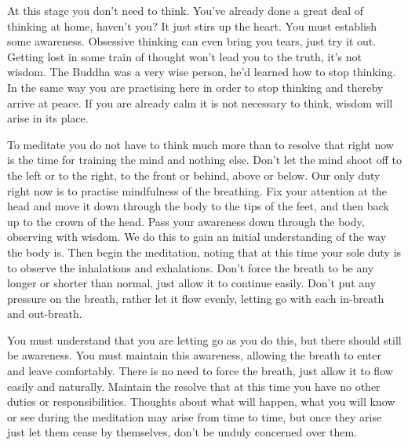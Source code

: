 At this stage you don't need to think. You've already done a great deal of thinking at home, haven't you? It just stirs up the heart. You must establish some awareness. Obsessive thinking can even bring you tears, just try it out. Getting lost in some train of thought won't lead you to the truth, it's not wisdom. The Buddha was a very wise person, he'd learned how to stop thinking. In the same way you are practising here in order to stop thinking and thereby arrive at peace. If you are already calm it is not necessary to think, wisdom will arise in its place.

To meditate you do not have to think much more than to resolve that right now is the time for training the mind and nothing else. Don't let the mind shoot off to the left or to the right, to the front or behind, above or below. Our only duty right now is to practise mindfulness of the breathing. Fix your attention at the head and move it down through the body to the tips of the feet, and then back up to the crown of the head. Pass your awareness down through the body, observing with wisdom. We do this to gain an initial understanding of the way the body is. Then begin the meditation, noting that at this time your sole duty is to observe the inhalations and exhalations. Don't force the breath to be any longer or shorter than normal, just allow it to continue easily. Don't put any pressure on the breath, rather let it flow evenly, letting go with each in-breath and out-breath.

You must understand that you are letting go as you do this, but there should still be awareness. You must maintain this awareness, allowing the breath to enter and leave comfortably. There is no need to force the breath, just allow it to flow easily and naturally. Maintain the resolve that at this time you have no other duties or responsibilities. Thoughts about what will happen, what you will know or see during the meditation may arise from time to time, but once they arise just let them cease by themselves, don't be unduly concerned over them.

